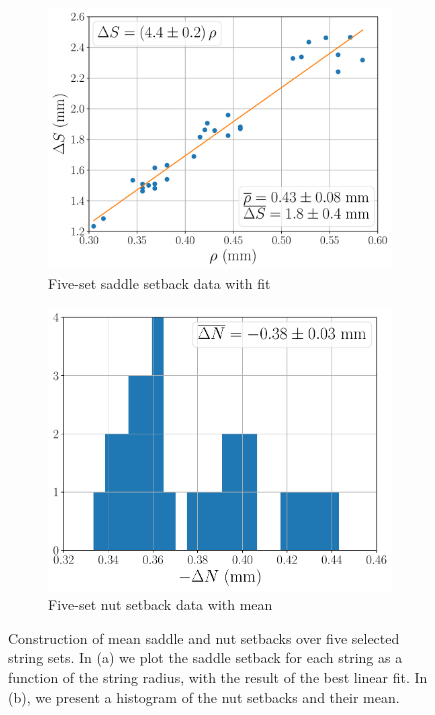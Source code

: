 \begin{figure}
  \centering
  \begin{subfigure}[b]{0.8\textwidth}
   \centering
   \includegraphics[width=5.0in]{figures/fit_ds}
   \caption{Five-set saddle setback data with fit}
   \label{fig:fit_ds}
  \end{subfigure}
  \par\vspace{0.25in}
  \begin{subfigure}[b]{0.8\textwidth}
   \centering
   \includegraphics[width=5.0in]{figures/hist_dn}
   \caption{Five-set nut setback data with mean}
   \label{fig:hist_dn}
  \end{subfigure}
  \caption{\label{fig:dsdn_mean} Construction of mean saddle and nut setbacks over five selected string sets. In (a) we plot the saddle setback for each string as a function of the string radius, with the result of the best linear fit. In (b), we present a histogram of the nut setbacks and their mean.}
 \end{figure}

